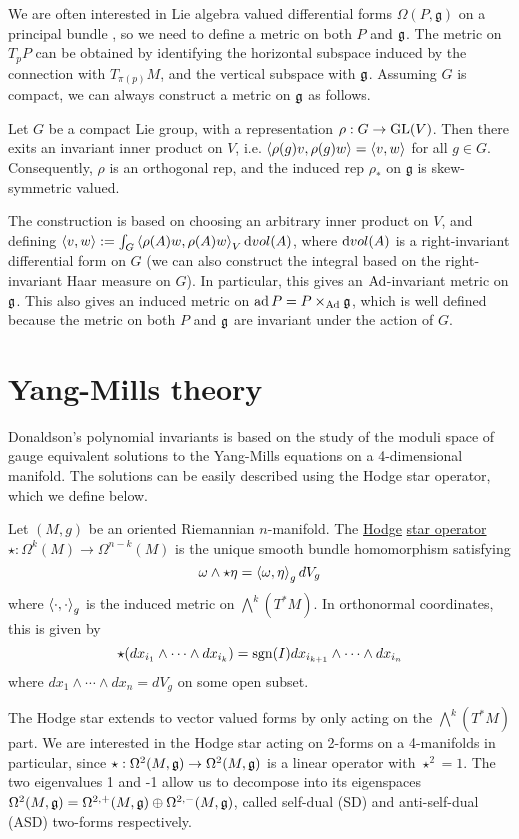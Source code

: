 We are often interested in Lie algebra valued differential forms 
$\Omega(P,\mathfrak{g})$ on a principal bundle , so we need to define a metric 
on both $P$ and $\operatorname{\mathfrak{g}}$. The metric on $T_pP$ can be obtained by identifying the 
horizontal subspace induced by the connection with  $T_{\pi(p)}M$, and the vertical
subspace with $\operatorname{\mathfrak{g}}$. Assuming $G$ is compact, we can always construct a metric on
 $\operatorname{\mathfrak{g}}$ as follows.
 \begin{thm} \label{thm:lie_inner_product}
	Let $G$ be a compact Lie group, with a representation  $\rho : G \to\operatorname{GL}(V)$.
	Then there exits an invariant inner product on  $V$, i.e. 
	$\gen{\rho(g)v,\rho(g)w} = \gen{v,w}$ for all $g\in G$. Consequently,
	$\rho$ is an orthogonal rep, and the induced rep $\rho_*$ on
	$\mathfrak{g}$ is skew-symmetric valued. 
\end{thm}
The construction is based on choosing an arbitrary inner product on $V$, and
defining $\gen{v,w} := \int_G \gen{\rho(A)w,\rho(A)w}_V \odif{vol}(A)$, where
$\odif{vol}(A)$ is a right-invariant differential form on $G$ (we can also
construct the integral based on the right-invariant Haar measure on $G$).
In particular, this gives an $\operatorname{Ad}$-invariant metric on $\operatorname{\mathfrak{g}}$. 
This also gives an induced metric on $\operatorname{ad} P = P\times_{\operatorname{Ad}}\operatorname{\mathfrak{g}}$, which is well 
defined because the metric on both $P$ and  $\operatorname{\mathfrak{g}}$ are invariant under the action 
of  $G$. 

\section{Yang-Mills theory}
Donaldson's polynomial invariants is based on the study of the moduli space of
gauge equivalent solutions to the Yang-Mills equations on a 4-dimensional 
manifold. The solutions can be easily described using the Hodge star operator,
which we define below.
\begin{defn}
	Let $(M,g)$ be an oriented Riemannian  $n$-manifold. The \underline{Hodge}
	\underline{star operator} $\star : \Omega^k(M) \to \Omega^{n-k}(M)$ is the 
	unique smooth bundle homomorphism satisfying 
	\begin{equation} \label{eq:hodge_property}
	\omega \wedge \star\eta = \gen{\omega,\eta}_g dV_g
	\end{equation}
	where $\gen{\cdot,\cdot}_g$ is the induced metric on $\bigwedge^k(T^*M)$.
	In orthonormal coordinates, this is given by
	\[
	\star(dx_{i_1}\wedge \cdots\wedge dx_{i_k}) = \operatorname{sgn}(I)dx_{i_{k+1}}\wedge \cdots \wedge
	dx_{i_n} 
	\] 
	where $dx_1\wedge\cdots\wedge dx_n = dV_g$ on some open subset.
\end{defn}
The Hodge star extends to vector valued forms by only acting on the
$\bigwedge^k(T^*M)$ part. 
We are interested in the Hodge star acting on 2-forms on a 4-manifolds in
particular, since $\star : \Omega^2(M,\operatorname{\mathfrak{g}})\to\Omega^2(M,\operatorname{\mathfrak{g}})$ is a linear operator
with $\star^2= 1$. The two eigenvalues 1 and -1 allow us to decompose into its
eigenspaces $\Omega^2(M,\operatorname{\mathfrak{g}}) = \Omega^{2,+}(M,\operatorname{\mathfrak{g}}) \oplus \Omega^{2,-}(M,\operatorname{\mathfrak{g}})$,
called self-dual (SD) and anti-self-dual (ASD) two-forms respectively.


